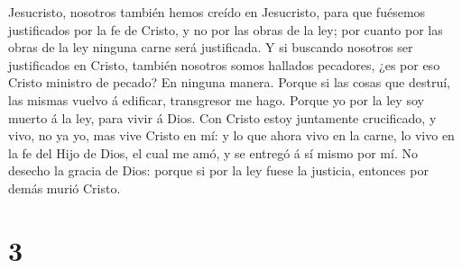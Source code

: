 Jesucristo, nosotros también hemos creído en Jesucristo, para que
fuésemos justificados por la fe de Cristo, y no por las obras de la ley;
por cuanto por las obras de la ley ninguna carne será justificada.
 Y si buscando nosotros ser justificados en Cristo, también
nosotros somos hallados pecadores, ¿es por eso Cristo ministro de
pecado? En ninguna manera.  Porque si las cosas que
destruí, las mismas vuelvo á edificar, transgresor me hago.
 Porque yo por la ley soy muerto á la ley, para vivir á
Dios.  Con Cristo estoy juntamente crucificado, y vivo, no
ya yo, mas vive Cristo en mí: y lo que ahora vivo en la carne, lo vivo
en la fe del Hijo de Dios, el cual me amó, y se entregó á sí mismo por
mí.  No desecho la gracia de Dios: porque si por la ley
fuese la justicia, entonces por demás murió Cristo.

\hypertarget{section-2}{%
\section{3}\label{section-2}}

